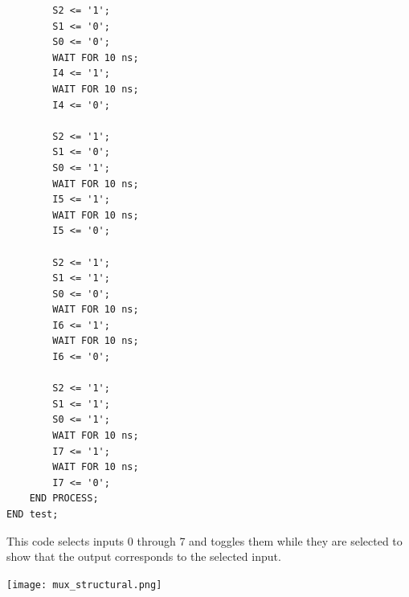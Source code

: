 \documentclass[12pt]{article}
\begin{document}
\begin{verbatim}
        S2 <= '1';
        S1 <= '0';
        S0 <= '0';
        WAIT FOR 10 ns;
        I4 <= '1';
        WAIT FOR 10 ns;
        I4 <= '0';

        S2 <= '1';
        S1 <= '0';
        S0 <= '1';
        WAIT FOR 10 ns;
        I5 <= '1';
        WAIT FOR 10 ns;
        I5 <= '0';

        S2 <= '1';
        S1 <= '1';
        S0 <= '0';
        WAIT FOR 10 ns;
        I6 <= '1';
        WAIT FOR 10 ns;
        I6 <= '0';

        S2 <= '1';
        S1 <= '1';
        S0 <= '1';
        WAIT FOR 10 ns;
        I7 <= '1';
        WAIT FOR 10 ns;
        I7 <= '0';
    END PROCESS;
END test;

\end{verbatim}
This code selects inputs 0 through 7 and toggles them while they are selected to show that the output corresponds to the selected input.

\texttt{[image: mux\_structural.png]}
\clearpage
\end{document}
